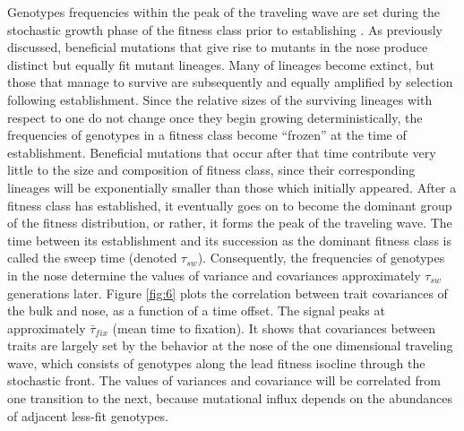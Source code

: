 \documentclass[9pt,twocolumn,twoside]{gsajnl}
\begin{document}
Genotypes frequencies within the peak of the traveling wave are set during the stochastic growth phase of the fitness class prior to establishing \citep{Desai2013}.  As previously discussed, beneficial mutations that give rise to mutants in the nose produce distinct but equally fit mutant lineages. Many of lineages become extinct, but those that manage to survive are subsequently and equally amplified by selection following establishment. Since the relative sizes of the surviving lineages with respect to one do not change once they begin growing deterministically, the frequencies of genotypes in a fitness class become ``frozen'' at the time of establishment. Beneficial mutations that occur after that time contribute very little to the size and composition of fitness class, since their corresponding lineages will be exponentially smaller than those which initially appeared. After a fitness class has established, it eventually goes on to become the dominant group of the fitness distribution, or rather, it forms the peak of the traveling wave. The time between its establishment and its succession as the dominant fitness class is called the sweep time (denoted $\tau_{sw}$). Consequently, the frequencies of genotypes in the nose determine the values of variance and covariances approximately $\tau_{sw}$ generations later. Figure \ref{fig:6} plots the correlation between trait covariances of the bulk and nose, as a function of a time offset. The signal peaks at approximately $\bar{\tau}_{fix}$ (mean time to fixation). It shows that covariances between traits are largely set by the behavior at the nose of the one dimensional traveling wave, which consists of genotypes along the lead fitness isocline through the stochastic front.  The values of variances and covariance will be correlated from one transition to the next, because mutational influx depends on the abundances of adjacent less-fit genotypes.
\end{document}
